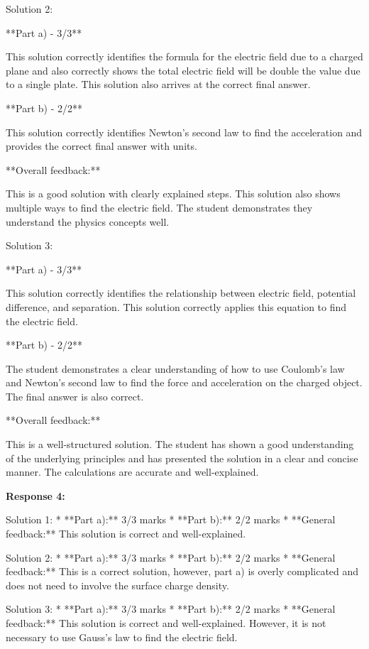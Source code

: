 \documentclass[a4paper,11pt]{article}
\begin{document}
Solution 2:

**Part a) - 3/3**

This solution correctly identifies the formula for the electric field due to a charged plane and also correctly shows the total electric field will be double the value due to a single plate. This solution also arrives at the correct final answer. 

**Part b) - 2/2**

This solution correctly identifies Newton's second law to find the acceleration and provides the correct final answer with units.

**Overall feedback:**

This is a good solution with clearly explained steps. This solution also shows multiple ways to find the electric field. The student demonstrates they understand the physics concepts well.

Solution 3:

**Part a) - 3/3**

This solution correctly identifies the relationship between electric field, potential difference, and separation. This solution correctly applies this equation to find the electric field.

**Part b) - 2/2**

The student demonstrates a clear understanding of how to use Coulomb's law and Newton's second law to find the force and acceleration on the charged object. The final answer is also correct.

**Overall feedback:**

This is a well-structured solution. The student has shown a good understanding of the underlying principles and has presented the solution in a clear and concise manner. The calculations are accurate and well-explained.

\bigskip    
\textbf{Response 4:}

Solution 1: 
*   **Part a):** 3/3 marks
*   **Part b):** 2/2 marks
*   **General feedback:** This solution is correct and well-explained.

Solution 2: 
*   **Part a):** 3/3 marks
*   **Part b):** 2/2 marks
*   **General feedback:** This is a correct solution, however, part a) is overly complicated and does not need to involve the surface charge density. 

Solution 3: 
*   **Part a):** 3/3 marks
*   **Part b):** 2/2 marks
*   **General feedback:** This solution is correct and well-explained. However, it is not necessary to use Gauss's law to find the electric field.
\end{document}
